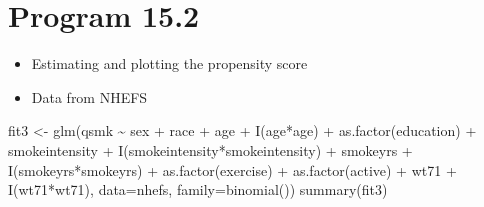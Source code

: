 \documentclass[
  10pt,
]{book}
\newenvironment{Shaded}{\begin{snugshade}}{\end{snugshade}}
\newcommand{\AttributeTok}[1]{\textcolor[rgb]{0.77,0.63,0.00}{#1}}
\newcommand{\FunctionTok}[1]{\textcolor[rgb]{0.00,0.00,0.00}{#1}}
\newcommand{\NormalTok}[1]{#1}
\newcommand{\OtherTok}[1]{\textcolor[rgb]{0.56,0.35,0.01}{#1}}
\newcommand{\SpecialCharTok}[1]{\textcolor[rgb]{0.00,0.00,0.00}{#1}}
\providecommand{\tightlist}{%
  \setlength{\itemsep}{0pt}\setlength{\parskip}{0pt}}
\begin{document}
\hypertarget{program-15.2}{%
\section{Program 15.2}\label{program-15.2}}

\begin{itemize}
\tightlist
\item
  Estimating and plotting the propensity score
\item
  Data from NHEFS
\end{itemize}

\begin{Shaded}
\begin{Highlighting}[]
\NormalTok{fit3 }\OtherTok{\textless{}{-}} \FunctionTok{glm}\NormalTok{(qsmk }\SpecialCharTok{\textasciitilde{}}\NormalTok{ sex }\SpecialCharTok{+}\NormalTok{ race }\SpecialCharTok{+}\NormalTok{ age }\SpecialCharTok{+} \FunctionTok{I}\NormalTok{(age}\SpecialCharTok{*}\NormalTok{age) }\SpecialCharTok{+} \FunctionTok{as.factor}\NormalTok{(education)}
            \SpecialCharTok{+}\NormalTok{ smokeintensity }\SpecialCharTok{+} \FunctionTok{I}\NormalTok{(smokeintensity}\SpecialCharTok{*}\NormalTok{smokeintensity) }\SpecialCharTok{+}\NormalTok{ smokeyrs}
            \SpecialCharTok{+} \FunctionTok{I}\NormalTok{(smokeyrs}\SpecialCharTok{*}\NormalTok{smokeyrs) }\SpecialCharTok{+} \FunctionTok{as.factor}\NormalTok{(exercise) }\SpecialCharTok{+} \FunctionTok{as.factor}\NormalTok{(active)}
            \SpecialCharTok{+}\NormalTok{ wt71 }\SpecialCharTok{+} \FunctionTok{I}\NormalTok{(wt71}\SpecialCharTok{*}\NormalTok{wt71), }\AttributeTok{data=}\NormalTok{nhefs, }\AttributeTok{family=}\FunctionTok{binomial}\NormalTok{())}
\FunctionTok{summary}\NormalTok{(fit3)}
\end{Highlighting}
\end{Shaded}
\end{document}
